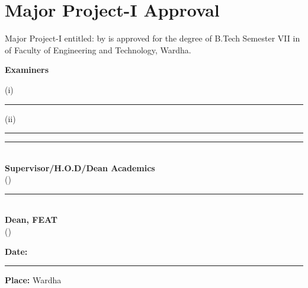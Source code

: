 \chapter*{Major Project-I Approval}
\singlespacing
\vspace{4pt}
\justifying
Major Project-I entitled: \textbf{\ProjectTitleCase} by \textbf{\StudentName} is approved for the degree of B.Tech Semester VII in \textbf{\DeptName} of Faculty of Engineering and Technology, Wardha.

\vfill

\noindent\hfill
\begin{minipage}{7.5cm}
\textbf{Examiners}
\end{minipage}

\vfill

\noindent\hfill
\begin{minipage}{7.5cm}
(i) \rule{6cm}{0.4pt}
\end{minipage}

\vfill

\noindent\hfill
\begin{minipage}{7.5cm}
(ii) \rule{6cm}{0.4pt}
\end{minipage}

\vfill

\noindent\hfill
\begin{minipage}{7.5cm}
\rule{6cm}{0.4pt}\\
\textbf{Supervisor/H.O.D/Dean Academics}\\
(\SupervisorName)
\end{minipage}

\vfill

\noindent\hfill
\begin{minipage}{7.5cm}
\rule{6cm}{0.4pt}\\
\textbf{Dean, FEAT}\\
(\DeanFEAT)
\end{minipage}

\vfill

\noindent\textbf{Date:} \rule{4cm}{0.4pt}

\vspace{12pt}
\noindent\textbf{Place:} Wardha

\onehalfspacing
\clearpage
